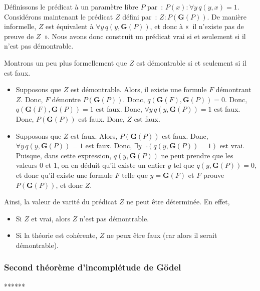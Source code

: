 Définissons le prédicat à un paramètre libre $P$ par : $P(x): \forall y \, q(y, x) = 1$. 
Considérons maintenant le prédicat $Z$ défini par : $Z: P(\mathbf{G}(P))$. 
De manière informelle, $Z$ est équivalent à $\forall y \, q(y, \mathbf{G}(P))$, et donc à « il n'existe pas de preuve de $Z$ ». 
Nous avons donc construit un prédicat vrai si et seulement si il n'est pas démontrable. 

Montrons un peu plus formellement que $Z$ est démontrable si et seulement si il est faux.
\begin{itemize}[nosep]
    \item Supposons que $Z$ est démontrable. 
        Alors, il existe une formule $F$ démontrant $Z$. 
        Donc, $F$ démontre $P(\mathbf{G}(P))$.
        Donc, $q(\mathbf{G}(F), \mathbf{G}(P)) = 0$. 
        Donc, $q(\mathbf{G}(F), \mathbf{G}(P)) = 1$ est faux. 
        Donc, $\forall y \, q(y,\mathbf{G}(P)) = 1$ est faux.
        Donc, $P(\mathbf{G}(P))$ est faux.
        Donc, $Z$ est faux.
    \item Supposons que $Z$ est faux.
        Alors, $P(\mathbf{G}(P))$ est faux.
        Donc, $\forall y \, q(y,\mathbf{G}(P)) = 1$ est faux.
        Donc, $\exists y \, \neg (q(y,\mathbf{G}(P)) = 1)$ est vrai.
        Puisque, dans cette expression, $q(y,\mathbf{G}(P))$ ne peut prendre que les valeurs $0$ et $1$, on en déduit qu'il existe un entier $y$ tel que $q(y,\mathbf{G}(P)) = 0$, et donc qu'il existe une formule $F$ telle que $y = \mathbf{G}(F)$ et $F$ prouve $P(\mathbf{G}(P))$, et donc $Z$. 
\end{itemize}

Ainsi, la valeur de varité du prédicat $Z$ ne peut être déterminée. 
En effet, 
\begin{itemize}[nosep]
    \item Si $Z$ et vrai, alors $Z$ n'est pas démontrable.
    \item Si la théorie est cohérente, $Z$ ne peux être faux (car alors il serait démontrable).
\end{itemize}

\subsubsection{Second théorème d'incomplétude de Gödel}

******
